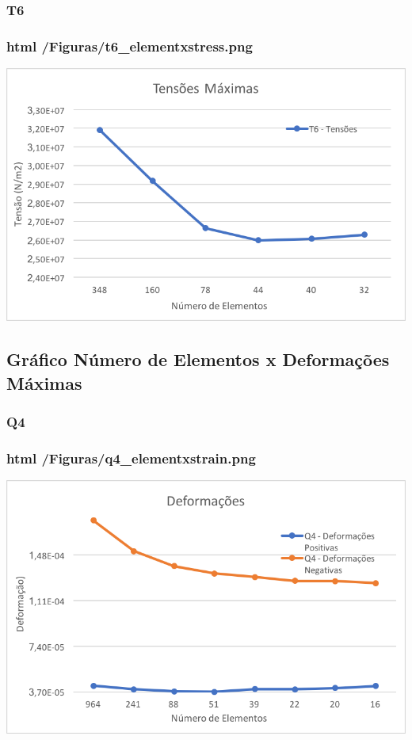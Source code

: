 \subsubsection*{T6}

\subsubsection*{html /\+Figuras/t6\+\_\+elementxstress.png}


\begin{DoxyImageNoCaption}
  \mbox{\includegraphics[width=\textwidth,height=\textheight/2,keepaspectratio=true]{t6_elementxstress.png}}
\end{DoxyImageNoCaption}
 

\subsection*{Gráfico Número de Elementos x Deformações Máximas}

\subsubsection*{Q4}

\subsubsection*{html /\+Figuras/q4\+\_\+elementxstrain.png}


\begin{DoxyImageNoCaption}
  \mbox{\includegraphics[width=\textwidth,height=\textheight/2,keepaspectratio=true]{q4_elementxstrain.png}}
\end{DoxyImageNoCaption}
 

